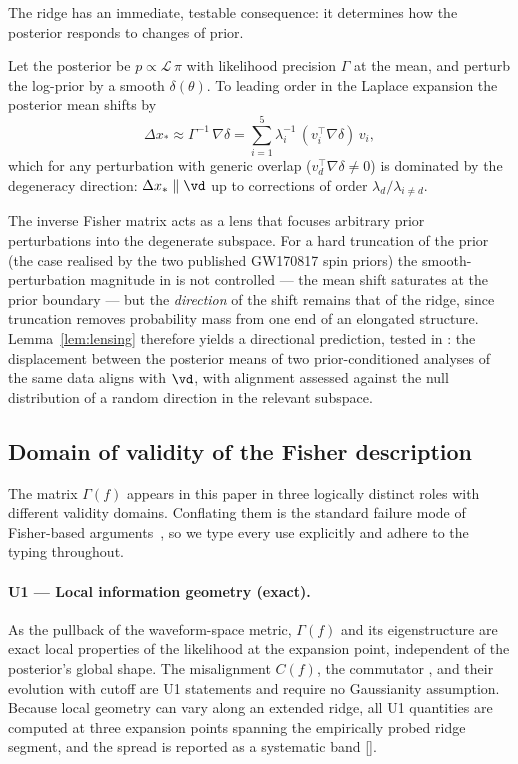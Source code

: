 The ridge has an immediate, testable consequence: it determines how the
posterior responds to changes of prior.

\begin{lemma}
\label{lem:lensing}
Let the posterior be $p \propto \mathcal{L}\,\pi$ with likelihood
precision $\Gamma$ at the mean, and perturb the log-prior by a smooth
$\delta(\theta)$. To leading order in the Laplace expansion the
posterior mean shifts by
\begin{equation}
\Delta x_{*} \approx \Gamma^{-1}\,\nabla\delta
= \sum_{i=1}^{5} \lambda_i^{-1}\,(v_i^{\top}\nabla\delta)\,v_i ,
\label{eq:lensing}
\end{equation}
which for any perturbation with generic overlap
($v_d^{\top}\nabla\delta \neq 0$) is dominated by the degeneracy
direction: $\Delta x_{*} \parallel \vd$ up to corrections of order
$\lambda_d/\lambda_{i\neq d}$.
\end{lemma}

The inverse Fisher matrix acts as a lens that focuses arbitrary prior
perturbations into the degenerate subspace. For a hard truncation of
the prior (the case realised by the two published GW170817 spin priors)
the smooth-perturbation magnitude in  is not
controlled --- the mean shift saturates at the prior boundary --- but
the \emph{direction} of the shift remains that of the ridge, since
truncation removes probability mass from one end of an elongated
structure. Lemma~\ref{lem:lensing} therefore yields a directional
prediction, tested in : the displacement between the
posterior means of two prior-conditioned analyses of the same data
aligns with $\vd$, with alignment assessed against the null
distribution of a random direction in the relevant subspace.

\subsection{Domain of validity of the Fisher description}
\label{sec:validity}

The matrix $\Gamma(f)$ appears in this paper in three logically
distinct roles with different validity domains. Conflating them is the
standard failure mode of Fisher-based
arguments~{\cite{vallisneri2008fisher}}, so we type every use explicitly
and adhere to the typing throughout.

\paragraph{U1 --- Local information geometry (exact).}
As the pullback of the waveform-space metric, $\Gamma(f)$ and its
eigenstructure are exact local properties of the likelihood at the
expansion point, independent of the posterior's global shape. The
misalignment $C(f)$, the commutator , and their
evolution with cutoff are U1 statements and require no Gaussianity
assumption. Because local geometry can vary along an extended ridge,
all U1 quantities are computed at three expansion points spanning the
empirically probed ridge segment, and the spread is reported as a
systematic band [].


